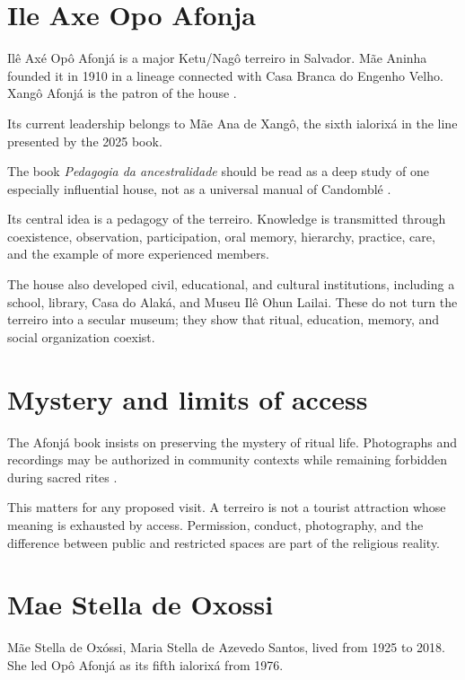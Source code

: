 \section{Ile Axe Opo Afonja}
\label{section-opo-afonja}

Il\^e Ax\'e Op\^o Afonj\'a is a major
Ketu/Nag\^o terreiro in Salvador.  M\~ae
Aninha founded it in 1910 in a lineage
connected with Casa Branca do Engenho
Velho.  Xang\^o Afonj\'a is the patron of
the house \cite{barata2025ancestralidade}.

Its current leadership belongs to M\~ae Ana
de Xang\^o, the sixth ialorix\'a in the
line presented by the 2025 book.

The book
\emph{Pedagogia da ancestralidade}
should be read as a deep study of one
especially influential house, not as a
universal manual of Candombl\'e
\cite{barata2025ancestralidade}.

Its central idea is a pedagogy of the
terreiro.  Knowledge is transmitted through
coexistence, observation, participation,
oral memory, hierarchy, practice, care,
and the example of more experienced
members.

The house also developed civil,
educational, and cultural institutions,
including a school, library, Casa do Alak\'a,
and Museu Il\^e Ohun Lailai.  These do not
turn the terreiro into a secular museum;
they show that ritual, education, memory,
and social organization coexist.

\section{Mystery and limits of access}
\label{section-mystery-limits}

The Afonj\'a book insists on preserving the
mystery of ritual life.  Photographs and
recordings may be authorized in community
contexts while remaining forbidden during
sacred rites
\cite{barata2025ancestralidade}.

This matters for any proposed visit.  A
terreiro is not a tourist attraction whose
meaning is exhausted by access.  Permission,
conduct, photography, and the difference
between public and restricted spaces are
part of the religious reality.

\section{Mae Stella de Oxossi}
\label{section-mae-stella}

M\~ae Stella de Ox\'ossi, Maria Stella de
Azevedo Santos, lived from 1925 to 2018.
She led Op\^o Afonj\'a as its fifth
ialorix\'a from 1976.

